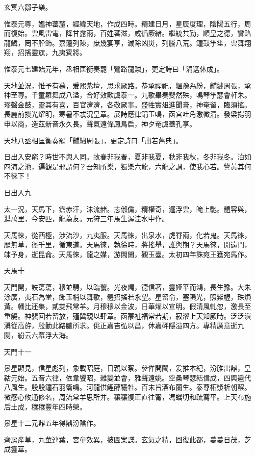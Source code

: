 \begin{pinyinscope}
玄冥六鄒子樂。

惟泰元尊，媼神蕃釐，經緯天地，作成四時。精建日月，星辰度理，陰陽五行，周而復始。雲風雷電，降甘露雨，百姓蕃滋，咸循厥緒。繼統共勤，順皇之德，鸞路龍鱗，罔不肸飾。嘉籩列陳，庶幾宴享，滅除凶災，列騰八荒。鐘鼓竽笙，雲舞翔翔，招搖靈旗，九夷賓將。

惟泰元七建始元年，丞相匡衡奏罷「鸞路龍鱗」，更定詩曰「涓選休成」。

天地並況，惟予有慕，爰熙紫壇，思求厥路。恭承禋祀，縕豫為紛，黼繡周張，承神至尊。千童羅舞成八溢，合好效歡虞泰一。九歌畢奏斐然殊，鳴琴竽瑟會軒朱。璆磬金鼓，靈其有喜，百官濟濟，各敬厥事。盛牲實俎進聞膏，神奄留，臨須搖。長麗前掞光燿明，寒暑不忒況皇章。展詩應律鋗玉鳴，函宮吐角激徵清。發梁揚羽申以商，造茲新音永久長。聲氣遠條鳳鳥启，神夕奄虞蓋孔享。

天地八丞相匡衡奏罷「黼繡周張」，更定詩曰「肅若舊典」。

日出入安窮？時世不與人同。故春非我春，夏非我夏，秋非我秋，冬非我冬。泊如四海之池，遍觀是邪謂何？吾知所樂，獨樂六龍，六龍之調，使我心若。訾黃其何不徠下！

日出入九

太一況，天馬下，霑赤汗，沬流赭。志俶儻，精權奇，逦浮雲，晻上馳。體容與，迣萬里，今安匹，龍為友。元狩三年馬生渥洼水中作。

天馬徠，從西極，涉流沙，九夷服。天馬徠，出泉水，虎脊兩，化若鬼。天馬徠，歷無草，徑千里，循東道。天馬徠，執徐時，將搖舉，誰與期？天馬徠，開遠門，竦予身，逝昆侖。天馬徠，龍之媒，游閶闔，觀玉臺。太初四年誅宛王獲宛馬作。

天馬十

天門開，詄蕩蕩，穆並騁，以臨饗。光夜燭，德信著，靈娅平而鴻，長生豫。大朱涂廣，夷石為堂，飾玉梢以舞歌，體招搖若永望。星留俞，塞隕光，照紫幄，珠熉黃。幡比还集，貳雙飛常羊。月穆穆以金波，日華燿以宣明。假清風軋忽，激長至重觴。神裴回若留放，殣冀親以肆章。函蒙祉福常若期，寂漻上天知厥時。泛泛滇滇從高斿，殷勤此路臚所求。佻正嘉吉弘以昌，休嘉砰隱溢四方。專精厲意逝九閡，紛云六幕浮大海。

天門十一

景星顯見，信星彪列，象載昭庭，日親以察。參侔開闔，爰推本紀，汾脽出鼎，皇祜元始。五音六律，依韋饗昭，雜變並會，雅聲遠姚。空桑琴瑟結信成，四興遞代八風生。殷殷鐘石羽籥鳴。河龍供鯉醇犧牲。百末旨酒布蘭生。泰尊柘漿析朝酲。微感心攸通修名，周流常羊思所并。穰穰復正直往甯，馮蠵切和疏寫平。上天布施后土成，穰穰豐年四時榮。

景星十二元鼎五年得鼎汾陰作。

齊房產草，九莖連葉，宮童效異，披圖案諜。玄氣之精，回復此都，蔓蔓日茂，芝成靈華。


\end{pinyinscope}
